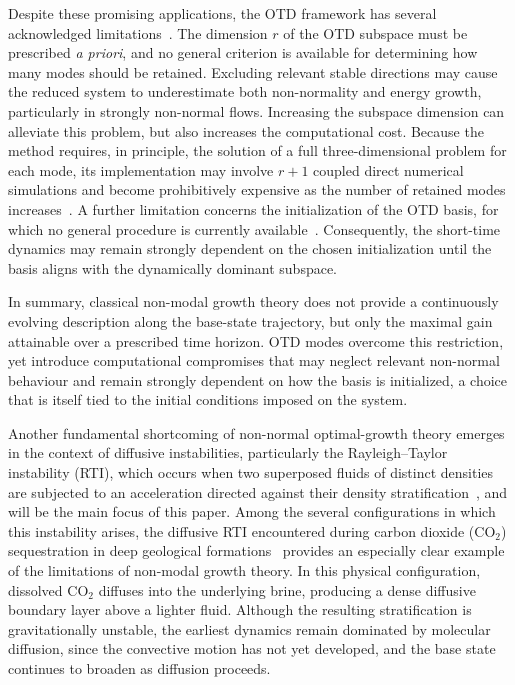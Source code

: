 Despite these promising applications, the OTD framework has several acknowledged limitations~\citep{kern-et-al-2021}. The dimension \(r\) of the OTD subspace must be prescribed \emph{a priori}, and no general criterion is available for determining how many modes should be retained. Excluding relevant stable directions may cause the reduced system to underestimate both non-normality and energy growth, particularly in strongly non-normal flows. Increasing the subspace dimension can alleviate this problem, but also increases the computational cost. Because the method requires, in principle, the solution of a full three-dimensional problem for each mode, its implementation may involve \(r+1\) coupled direct numerical simulations and become prohibitively expensive as the number of retained modes increases~\citep{beneitez-et-al-2023}. A further limitation concerns the initialization of the OTD basis, for which no general procedure is currently available~\citep{kern-et-al-2024}. Consequently, the short-time dynamics may remain strongly dependent on the chosen initialization until the basis aligns with the dynamically dominant subspace.

In summary, classical non-modal growth theory does not provide a continuously evolving description along the base-state trajectory, but only the maximal gain attainable over a prescribed time horizon. OTD modes overcome this restriction, yet introduce computational compromises that may neglect relevant non-normal behaviour and remain strongly dependent on how the basis is initialized, a choice that is itself tied to the initial conditions imposed on the system.

Another fundamental shortcoming of non-normal optimal-growth theory emerges in the context of diffusive instabilities, particularly the Rayleigh--Taylor instability (RTI), which occurs when two superposed fluids of distinct densities are subjected to an acceleration directed against their density stratification~\citep{rayleigh-1883,taylor-1950}, and will be the main focus of this paper. Among the several configurations in which this instability arises, the diffusive RTI encountered during carbon dioxide (\(\mathrm{CO}_2\)) sequestration in deep geological formations~\citep{orr-2009} provides an especially clear example of the limitations of non-modal growth theory. In this physical configuration, dissolved \(\mathrm{CO}_2\) diffuses into the underlying brine, producing a dense diffusive boundary layer above a lighter fluid. Although the resulting stratification is gravitationally unstable, the earliest dynamics remain dominated by molecular diffusion, since the convective motion has not yet developed, and the base state continues to broaden as diffusion proceeds.

